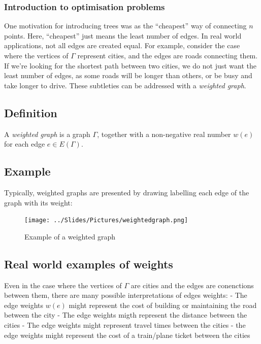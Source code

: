 \documentclass[]{article}
\begin{document}
\subsubsection{Introduction to optimisation
problems}\label{introduction-to-optimisation-problems}

One motivation for introducing trees was as the ``cheapest'' way of
connecting \(n\) points. Here, ``cheapest'' just means the least number
of edges. In real world applications, not all edges are created equal.
For example, consider the case where the vertices of \(\Gamma\)
represent cities, and the edges are roads connecting them. If we're
looking for the shortest path between two cities, we do not just want
the least number of edges, as some roads will be longer than others, or
be busy and take longer to drive. These subtleties can be addressed with
a \emph{weighted graph}.

\subsection{Definition}\label{definition-7}

A \emph{weighted graph} is a graph \(\Gamma\), together with a
non-negative real number \(w(e)\) for each edge \(e\in E(\Gamma)\).

\subsection{Example}\label{example-4}

Typically, weighted graphs are presented by drawing labelling each edge
of the graph with its weight:

\begin{figure}[htbp]
\centering
\texttt{[image: ../Slides/Pictures/weightedgraph.png]}
\caption{Example of a weighted graph}
\end{figure}

\subsection{Real world examples of
weights}\label{real-world-examples-of-weights}

Even in the case where the vertices of \(\Gamma\) are cities and the
edges are conenctions between them, there are many possible
interpretations of edges weights: - The edge weights \(w(e)\) might
represent the cost of building or maintaining the road between the city
- The edge weights migth represent the distance between the cities - The
edge weights might represent travel times between the cities - the edge
weights might represent the cost of a train/plane ticket between the
cities
\end{document}
